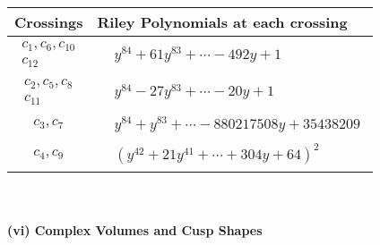 \documentclass[1p]{elsarticle_modified}
\theoremstyle{definition}
\begin{document}
\begin{tabular}{m{50pt}|m{274pt}}
Crossings & \hspace{64pt}Riley Polynomials at each crossing \\
\hline $$\begin{aligned}c_{1},c_{6},c_{10}\\c_{12}\end{aligned}$$&$\begin{aligned}
&y^{84}+61 y^{83}+\cdots-492 y+1
\end{aligned}$\\
\hline $$\begin{aligned}c_{2},c_{5},c_{8}\\c_{11}\end{aligned}$$&$\begin{aligned}
&y^{84}-27 y^{83}+\cdots-20 y+1
\end{aligned}$\\
\hline $$\begin{aligned}c_{3},c_{7}\end{aligned}$$&$\begin{aligned}
&y^{84}+y^{83}+\cdots-880217508 y+35438209
\end{aligned}$\\
\hline $$\begin{aligned}c_{4},c_{9}\end{aligned}$$&$\begin{aligned}
&(y^{42}+21 y^{41}+\cdots+304 y+64)^{2}
\end{aligned}$\\
\hline
\end{tabular}\\~\\
\newpage\flushleft \textbf{(vi) Complex Volumes and Cusp Shapes}
\end{document}
